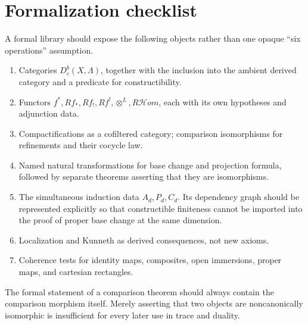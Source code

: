 \section{Formalization checklist}

A formal library should expose the following objects rather than one opaque
``six operations'' assumption.
\begin{enumerate}
  \item Categories \(D^b_c(X,\Lambda)\), together with the inclusion into the
  ambient derived category and a predicate for constructibility.
  \item Functors \(f^*,Rf_*,Rf_!,Rf^!,\otimes^L,R\mathcal Hom\), each with its
  own hypotheses and adjunction data.
  \item Compactifications as a cofiltered category; comparison isomorphisms
  for refinements and their cocycle law.
  \item Named natural transformations for base change and projection formula,
  followed by separate theorems asserting that they are isomorphisms.
  \item The simultaneous induction data \(A_d,P_d,C_d\).  Its dependency graph
  should be represented explicitly so that constructible finiteness cannot be
  imported into the proof of proper base change at the same dimension.
  \item Localization and Kunneth as derived consequences, not new axioms.
  \item Coherence tests for identity maps, composites, open immersions, proper
  maps, and cartesian rectangles.
\end{enumerate}
The formal statement of a comparison theorem should always contain the
comparison morphism itself.  Merely asserting that two objects are
noncanonically isomorphic is insufficient for every later use in trace and
duality.
